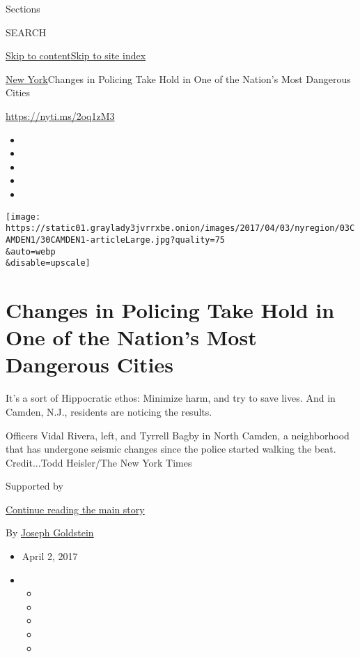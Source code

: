 Sections

SEARCH

\protect\hyperlink{site-content}{Skip to
content}\protect\hyperlink{site-index}{Skip to site index}

\href{/section/nyregion}{New York}\textbar{}Changes in Policing Take
Hold in One of the Nation's Most Dangerous Cities

\url{https://nyti.ms/2oq1zM3}

\begin{itemize}
\item
\item
\item
\item
\item
\end{itemize}

\texttt{[image: https://static01.graylady3jvrrxbe.onion/images/2017/04/03/nyregion/03CAMDEN1/30CAMDEN1-articleLarge.jpg?quality=75\\\&auto=webp\\\&disable=upscale]}

\hypertarget{changes-in-policing-take-hold-in-one-of-the-nations-most-dangerous-cities}{%
\section{Changes in Policing Take Hold in One of the Nation's Most
Dangerous
Cities}\label{changes-in-policing-take-hold-in-one-of-the-nations-most-dangerous-cities}}

It's a sort of Hippocratic ethos: Minimize harm, and try to save lives.
And in Camden, N.J., residents are noticing the results.

Officers Vidal Rivera, left, and Tyrrell Bagby in North Camden, a
neighborhood that has undergone seismic changes since the police started
walking the beat. Credit...Todd Heisler/The New York Times

Supported by

\protect\hyperlink{after-sponsor}{Continue reading the main story}

By \href{http://www.nytimes3xbfgragh.onion/by/joseph-goldstein}{Joseph
Goldstein}

\begin{itemize}
\item
  April 2, 2017
\item
  \begin{itemize}
  \item
  \item
  \item
  \item
  \item
  \end{itemize}
\end{itemize}


